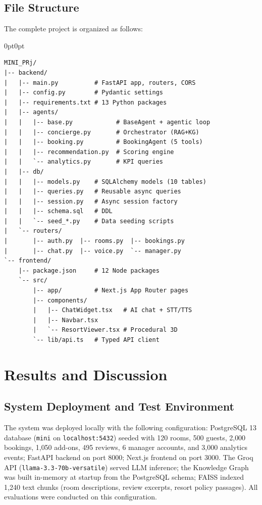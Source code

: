 \documentclass[11pt,a4paper]{report}
\begin{document}
\section{File Structure}

The complete project is organized as follows:

{\small
\begin{adjustwidth}{0pt}{0pt}
\begin{verbatim}
MINI_PRj/
|-- backend/
|   |-- main.py          # FastAPI app, routers, CORS
|   |-- config.py        # Pydantic settings
|   |-- requirements.txt # 13 Python packages
|   |-- agents/
|   |   |-- base.py            # BaseAgent + agentic loop
|   |   |-- concierge.py       # Orchestrator (RAG+KG)
|   |   |-- booking.py         # BookingAgent (5 tools)
|   |   |-- recommendation.py  # Scoring engine
|   |   `-- analytics.py       # KPI queries
|   |-- db/
|   |   |-- models.py    # SQLAlchemy models (10 tables)
|   |   |-- queries.py   # Reusable async queries
|   |   |-- session.py   # Async session factory
|   |   |-- schema.sql   # DDL
|   |   `-- seed_*.py    # Data seeding scripts
|   `-- routers/
|       |-- auth.py  |-- rooms.py  |-- bookings.py
|       |-- chat.py  |-- voice.py  `-- manager.py
`-- frontend/
    |-- package.json     # 12 Node packages
    `-- src/
        |-- app/         # Next.js App Router pages
        |-- components/
        |   |-- ChatWidget.tsx   # AI chat + STT/TTS
        |   |-- Navbar.tsx
        |   `-- ResortViewer.tsx # Procedural 3D
        `-- lib/api.ts   # Typed API client
\end{verbatim}
\end{adjustwidth}
}

\chapter{Results and Discussion}

\section{System Deployment and Test Environment}

The system was deployed locally with the following configuration: PostgreSQL 13 database (\texttt{mini} on \texttt{localhost:5432}) seeded with 120 rooms, 500 guests, 2{,}000 bookings, 1{,}050 add-ons, 495 reviews, 6 manager accounts, and 3{,}000 analytics events; FastAPI backend on port 8000; Next.js frontend on port 3000. The Groq API (\texttt{llama-3.3-70b-versatile}) served LLM inference; the Knowledge Graph was built in-memory at startup from the PostgreSQL schema; FAISS indexed 1{,}240 text chunks (room descriptions, review excerpts, resort policy passages). All evaluations were conducted on this configuration.
\end{document}
